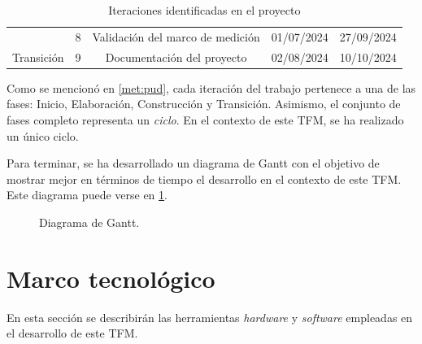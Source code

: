\begin{table}[H]
{\begin{tabular}{|c|c|c|c|c|}
                                                              & 8                         & Validación del marco de medición                                 & 01/07/2024      & 27/09/2024     \\ \cline{2-5} 
        \multirow{-2}{*}{Transición}                          & 9                         & Documentación del proyecto                                       & 02/08/2024      & 10/10/2024     \\ \hline
        \end{tabular}
    }
    \caption{Iteraciones identificadas en el proyecto}
    \label{tabla_iteraciones}
    \end{table}

Como se mencionó en \ref{met:pud}, cada iteración del trabajo pertenece a una de las fases:  Inicio, Elaboración, Construcción y Transición. Asimismo, el conjunto de fases completo representa un \textit{ciclo}. En el contexto de este \ac{TFM}, se ha realizado un único ciclo.

Para terminar, se ha desarrollado un diagrama de Gantt con el objetivo de mostrar mejor en términos de tiempo el desarrollo en el contexto de este \ac{TFM}. Este diagrama puede verse en \ref{fig:diagramaGantt}.

\begin{figure}[H]
    \centering
    \caption{Diagrama de Gantt.} 
    \label{fig:diagramaGantt}
\end{figure}


\section{Marco tecnológico}

En esta sección se describirán las herramientas \textit{hardware} y \textit{software} empleadas en el desarrollo de este \ac{TFM}.

